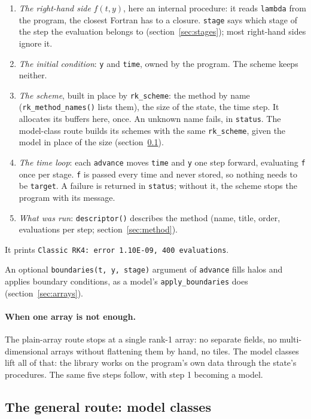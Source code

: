 \documentclass[11pt,a4paper]{article}
\newcommand{\code}[1]{\texttt{#1}}
\begin{document}
\begin{enumerate}
  \item \emph{The right-hand side} $f(t, y)$, here an internal procedure: it
    reads \code{lambda} from the program, the closest Fortran has to a
    closure. \code{stage} says which stage of the step the evaluation belongs
    to (section~\ref{sec:stages}); most right-hand sides ignore it.
  \item \emph{The initial condition}: \code{y} and \code{time}, owned by the
    program. The scheme keeps neither.
  \item \emph{The scheme}, built in place by \code{rk\_scheme}: the method by
    name (\code{rk\_method\_names()} lists them), the size of the state, the
    time step. It allocates its buffers here, once. An unknown name fails, in
    \code{status}. The model-class route builds its schemes with the same
    \code{rk\_scheme}, given the model in place of the size
    (section~\ref{sec:general}).
  \item \emph{The time loop}: each \code{advance} moves \code{time} and
    \code{y} one step forward, evaluating \code{f} once per stage. \code{f}
    is passed every time and never stored, so nothing needs to be
    \code{target}. A failure is returned in \code{status}; without it, the
    scheme stops the program with its message.
  \item \emph{What was run}: \code{descriptor()} describes the method (name,
    title, order, evaluations per step; section~\ref{sec:method}).
\end{enumerate}
It prints \code{Classic RK4: error 1.10E-09, 400 evaluations}.

An optional \code{boundaries(t, y, stage)} argument of \code{advance} fills
halos and applies boundary conditions, as a model's \code{apply\_boundaries}
does (section~\ref{sec:arrays}).

\paragraph{When one array is not enough.} The plain-array route stops at a
single rank-1 array: no separate fields, no multi-dimensional arrays without
flattening them by hand, no tiles. The model classes lift all of that: the
library works on the program's own data through the state's procedures. The
same five steps follow, with step 1 becoming a model.

\subsection{The general route: model classes}
\label{sec:general}
\end{document}
